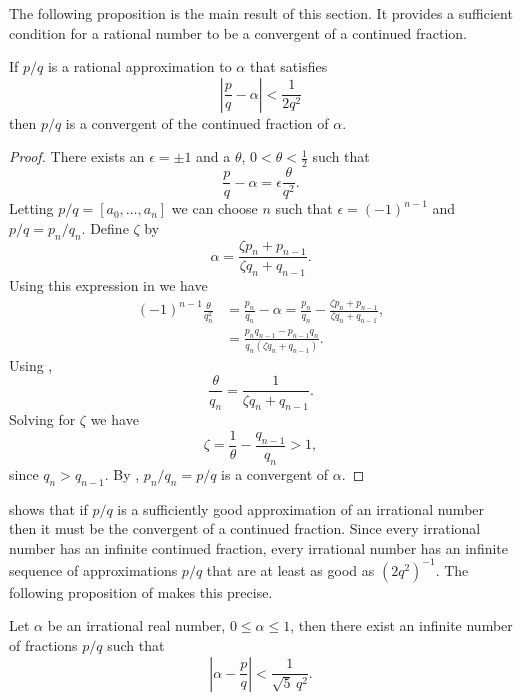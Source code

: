 The following proposition is the main result of this section.  It
provides a sufficient condition for a rational number to be a
convergent of a continued fraction. 

\begin{proposition}\label{RationalCF:Prop}
If $p/q$ is a rational approximation to $\alpha$ that satisfies 
\[
\left| \frac{p}{q} - \alpha \right| < \frac{1}{2 q^2}
\]
then $p/q$ is a convergent of the continued fraction of $\alpha$.
\end{proposition}

\begin{proof}
There exists an $\epsilon = \pm 1$ and a $\theta$, $0 < \theta <
\frac{1}{2}$ such that
\begin{equation}\label{RationCF:Prop:Eq}
\frac{p}{q} - \alpha = \epsilon \frac{\theta}{q^2}.
\end{equation}
Letting $p/q = [a_0, \ldots, a_n]$ we can choose $n$ such that
$\epsilon = (-1)^{n-1}$ and $p/q = p_n/q_n$.  Define  $\zeta$ by 
\[
\alpha = \frac{\zeta p_n + p_{n-1}}{\zeta q_n + q_{n-1}}.
\]
Using this expression in  we have
\[
\begin{aligned}
(-1)^{n-1} \frac{\theta}{q_n^2} & = \frac{p_n}{q_n} - \alpha =
   \frac{p_n}{q_n} 
     - \frac{\zeta p_n + p_{n-1}}{\zeta q_n + q_{n-1}},\\
  & = \frac{p_n q_{n-1} - p_{n-1} q_n}{q_n (\zeta q_n + q_{n-1})}.
\end{aligned}
\]
Using ,
\[
\frac{\theta}{q_n} = \frac{1}{\zeta q_n + q_{n-1}}.
\]
Solving for $\zeta$ we have
\[
\zeta = \frac{1}{\theta} - \frac{q_{n-1}}{q_n} > 1,
\]
since $q_n > q_{n-1}$.  By , $p_n/q_n = p/q$
is a convergent of $\alpha$.
\end{proof}

 shows that if $p/q$ is a sufficiently good
approximation of an irrational number then it must be the convergent
of a continued fraction.  Since every irrational number has an infinite
continued fraction, every irrational number has an infinite sequence
of approximations $p/q$ that are at least as good as $(2q^2)^{-1}$.
The following proposition of {\Hurwitz} \cite{Hurwitz1891-xk} makes this
precise. 

\begin{proposition}[Hurwitz]
Let $\alpha$ be an irrational real number, $0 \le \alpha \le 1$, 
then there exist an infinite number of fractions $p/q$ such that
\[
\left| \alpha - \frac{p}{q} \right| < \frac{1}{\sqrt{5} \,q^2}.
\]
\end{proposition}

